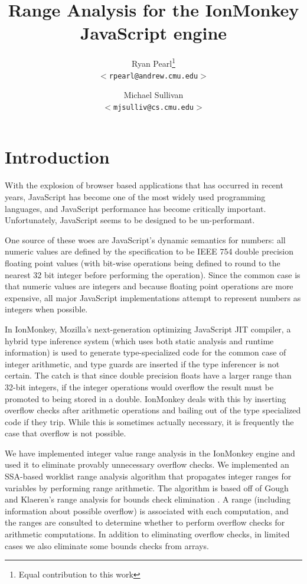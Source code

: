 \documentclass{article}
\begin{document}
\title{\bf Range Analysis for the IonMonkey JavaScript engine}

\author{
Ryan Pearl\footnote{Equal contribution to this work}\\
\texttt{$<$rpearl@andrew.cmu.edu$>$}\\
\and
Michael Sullivan\footnotemark[\value{footnote}]\\
\texttt{$<$mjsulliv@cs.cmu.edu$>$}\\
}

\maketitle

\section{Introduction}
With the explosion of browser based applications that has occurred in
recent years, JavaScript has become one of the most widely used
programming languages, and JavaScript performance has become
critically important. Unfortunately, JavaScript seems to be designed
to be un-performant.

One source of these woes are JavaScript's dynamic semantics for
numbers: all numeric values are defined by the specification to be
IEEE 754 double precision floating point values (with bit-wise
operations being defined to round to the nearest 32 bit integer before
performing the operation). Since the common case is that numeric
values are integers and because floating point operations are
more expensive, all major JavaScript implementations attempt to
represent numbers as integers when possible.

In IonMonkey, Mozilla's next-generation optimizing JavaScript JIT
compiler, a hybrid type inference system (which uses both static analysis and
runtime information\cite{BHackettTI}) is used to generate
type-specialized code for the common case of integer arithmetic, and
type guards are inserted if the type inferencer is not certain. The
catch is that since double precision floats have a larger range than
32-bit integers, if the integer operations would overflow the result
must be promoted to being stored in a double. IonMonkey deals with
this by inserting overflow checks after arithmetic operations and
bailing out of the type specialized code if they trip. While this is
sometimes actually necessary, it is frequently the case that overflow
is not possible.

We have implemented integer value range analysis in the IonMonkey
engine and used it to eliminate provably unnecessary overflow checks.
We implemented an SSA-based worklist range analysis algorithm that
propagates integer ranges for variables by performing range
arithmetic. The algorithm is based off of Gough and Klaeren's range
analysis for bounds check elimination
\cite{Gough94eliminatingrange}. A range (including information about
possible overflow) is associated with each computation, and the ranges
are consulted to determine whether to perform overflow checks for
arithmetic computations.  In addition to eliminating overflow checks, in
limited cases we also eliminate some bounds checks from arrays.
\end{document}

